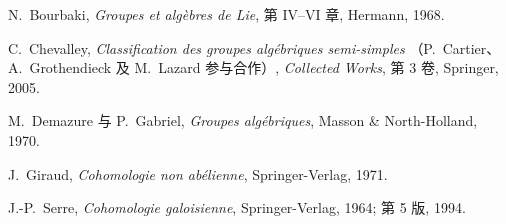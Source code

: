 \begin{description}
\item[{[BLie]}]
N.~Bourbaki, \emph{Groupes et algèbres de Lie}, 第 IV--VI 章, Hermann, 1968.

\item[{[Ch05]}]
C.~Chevalley, \emph{Classification des groupes algébriques semi-simples}
\textup{（P.~Cartier、A.~Grothendieck 及 M.~Lazard 参与合作）},
\emph{Collected Works}, 第 3 卷, Springer, 2005.

\item[{[DG70]}]
M.~Demazure 与 P.~Gabriel, \emph{Groupes algébriques}, Masson \& North-Holland, 1970.

\item[{[Gi71]}]
J.~Giraud, \emph{Cohomologie non abélienne}, Springer-Verlag, 1971.

\item[{[Se64]}]
J.-P.~Serre, \emph{Cohomologie galoisienne}, Springer-Verlag, 1964; 第 5 版, 1994.
\end{description}

